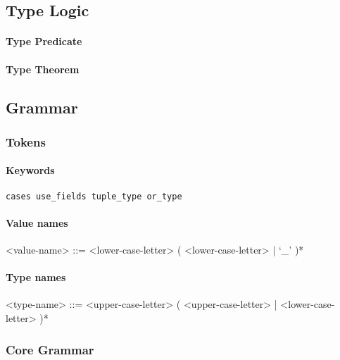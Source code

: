 \documentclass{article}
\begin{document}
\subsection{Type Logic}

\paragraph{Type Predicate}

\paragraph{Type Theorem}

\subsection{Grammar}
\subsubsection{Tokens}

\paragraph{Keywords}

\begin{verbatim}
cases use_fields tuple_type or_type
\end{verbatim}

\paragraph{Value names}

\begin{grammar}
<value-name> ::= 
<lower-case-letter> ( <lower-case-letter> | `_' )*
\end{grammar}

\paragraph{Type names}

\begin{grammar}
<type-name> ::= 
<upper-case-letter> ( <upper-case-letter> | <lower-case-letter> )*
\end{grammar}



\subsubsection{Core Grammar}
\end{document}
